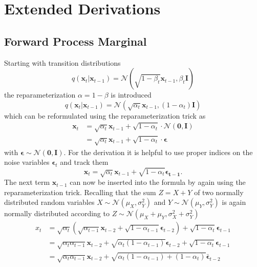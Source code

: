 %
\chapter{Extended Derivations}
\section{Forward Process Marginal}
\label{app:forward}
Starting with transition distributions
\begin{equation}
    q(\bm{x}_t|\bm{x}_{t-1}) = \mathcal{N}(\sqrt{1-\beta_t} \bm{x}_{t-1}, \beta_t \bm{I})
\end{equation}
the reparameterization $\alpha = 1 - \beta$ is introduced
\begin{equation}
    q(\bm{x}_t|\bm{x}_{t-1}) = \mathcal{N}(\sqrt{\alpha_t} \bm{x}_{t-1}, (1-\alpha_t) \bm{I})
\end{equation}
which can be reformulated using the reparameterization trick as
\begin{align}
    \bm{x}_t & = \sqrt{\alpha_t}\bm{x}_{t-1} + \sqrt{1-\alpha_t}\cdot\mathcal{N}(\bm{0}, \bm{I}) \\
             & = \sqrt{\alpha_t}\bm{x}_{t-1} + \sqrt{1-\alpha_t} \cdot \bm{\epsilon}
\end{align}
with $\bm{\epsilon} \sim \mathcal{N}(\bm{0}, \bm{I})$. For the derivation it is helpful to use proper indices on the noise variables $\bm{\epsilon}_t$ and track them
\begin{equation}
    \bm{x}_{t} = \sqrt{\alpha_t}\bm{x}_{t-1} + \sqrt{1-\alpha_t}\bm{\epsilon_{t-1}}.
    \label{eq:forward_randomvar}
\end{equation}
The next term $\bm{x}_{t-1}$ can now be inserted into the formula by again using the reparameterization trick. Recalling that the sum $Z = X + Y$ of two normally distributed random variables $X \sim \mathcal{N}(\mu_X, \sigma_Y^2)$ and $Y \sim \mathcal{N}(\mu_Y, \sigma_Y^2)$ is again normally distributed according to $Z \sim \mathcal{N}(\mu_X + \mu_Y, \sigma_X^2 + \sigma_Y^2)$
\begin{align}
    x_t & = \sqrt{\alpha_t} \left( \sqrt{\alpha_{t-1}} \bm{x}_{t-2} + \sqrt{1-\alpha_{t-1}}\bm{\epsilon}_{t-2} \right) + \sqrt{1-\alpha_{t}} \bm{\epsilon}_{t-1} \\
        & = \sqrt{\alpha_{t}\alpha_{t-1}} \bm{x}_{t-2} + \sqrt{\alpha_{t}(1-\alpha_{t-1})} \bm{\epsilon}_{t-2} + \sqrt{1-\alpha_{t}} \bm{\epsilon}_{t-1}         \\
        & = \sqrt{\alpha_{t}\alpha_{t-1}} \bm{x}_{t-2} + \sqrt{\alpha_{t}(1-\alpha_{t-1}) + (1-\alpha_{t})} \bm{\bar{\epsilon}}_{t-2}
\end{align}
